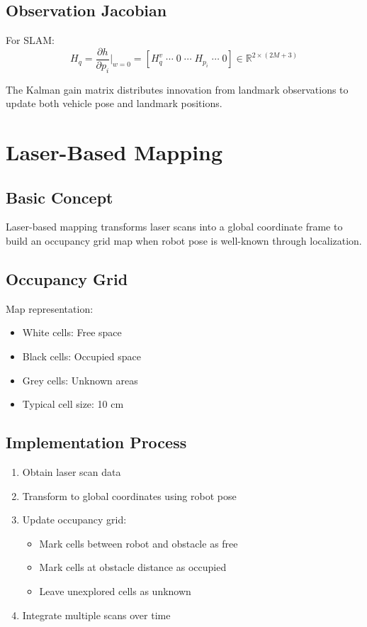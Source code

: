 \documentclass[openany]{book}
\theoremstyle{definition}
\theoremstyle{remark}
\newcommand{\definitionbox}[1]{
\begin{tcolorbox}[colback=blue!5,colframe=blue!40!black,title=Definition]
 #1
\end{tcolorbox}
}
\newcommand{\note}[1]{
\begin{tcolorbox}[colback=green!5,colframe=green!40!black,title=Note]
 #1
\end{tcolorbox}
}
\begin{document}
\subsection{Observation Jacobian}
For SLAM:
\begin{equation}
   H_q = \frac{\partial h}{\partial p_i}\bigg|_{w=0} = [H_q^v \; \cdots \; 0 \; \cdots \; H_{p_i} \; \cdots \; 0] \in \mathbb{R}^{2\times(2M+3)}
\end{equation}

\note{The Kalman gain matrix distributes innovation from landmark observations to update both vehicle pose and landmark positions.}

\section{Laser-Based Mapping}

\subsection{Basic Concept}
\definitionbox{Laser-based mapping transforms laser scans into a global coordinate frame to build an occupancy grid map when robot pose is well-known through localization.}

\subsection{Occupancy Grid}
Map representation:
\begin{itemize}
   \item White cells: Free space
   \item Black cells: Occupied space
   \item Grey cells: Unknown areas
   \item Typical cell size: 10 cm
\end{itemize}

\subsection{Implementation Process}
\begin{enumerate}
   \item Obtain laser scan data
   \item Transform to global coordinates using robot pose
   \item Update occupancy grid:
   \begin{itemize}
       \item Mark cells between robot and obstacle as free
       \item Mark cells at obstacle distance as occupied
       \item Leave unexplored cells as unknown
   \end{itemize}
   \item Integrate multiple scans over time
\end{enumerate}
\end{document}
